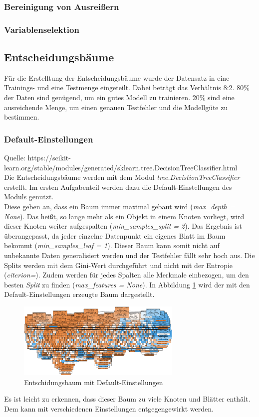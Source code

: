 \subsubsection{Bereinigung von Ausreißern}

\subsubsection{Variablenselektion}




\vspace{1cm}
\subsection{Entscheidungsbäume}
Für die Erstelltung der Entscheidungsbäume wurde der Datensatz in eine Trainings- und eine Testmenge eingeteilt. Dabei beträgt das Verhältnis 8:2. 80\% der Daten sind genügend, um ein gutes Modell zu trainieren. 20\% sind eine ausreichende Menge, um einen genauen Testfehler und die Modellgüte zu bestimmen.
\subsubsection{Default-Einstellungen}
Quelle: https://scikit-learn.org/stable/modules/generated/sklearn.tree.DecisionTreeClassifier.html\\
Die Entscheidungsbäume werden mit dem Modul \emph{tree.DecistionTreeClassifier} erstellt. Im ersten Aufgabenteil werden dazu die Default-Einstellungen des Moduls genutzt.\\
\noindent \hspace*{7mm}
Diese geben an, dass ein Baum immer maximal gebaut wird (\emph{max\_depth = None}). Das heißt, so lange mehr als ein Objekt in einem Knoten vorliegt, wird dieser Knoten weiter aufgespalten (\emph{min\_samples\_split = 2}). Das Ergebnis ist überangepasst, da jeder einzelne Datenpunkt ein eigenes Blatt im Baum bekommt (\emph{min\_samples\_leaf = 1}). Dieser Baum kann somit nicht auf unbekannte Daten generalisiert werden und der Testfehler fällt sehr hoch aus. Die Splits werden mit dem Gini-Wert durchgeführt und nicht mit der Entropie (\emph{citerion=}). Zudem werden für jedes Spalten alle Merkmale einbezogen, um den besten \emph{Split} zu finden (\emph{max\_features = None}). In Abbildung \ref{fig:treedefault} wird der mit den Default-Einstellungen erzeugte Baum dargestellt.
\begin{figure}[h]
	\centering
	\includegraphics[width = 0.7\textwidth]{Bilder/treedefault}
	\caption{Entschidungsbaum mit Default-Einstellungen}
	\label{fig:treedefault}
\end{figure}
Es ist leicht zu erkennen, dass dieser Baum zu viele Knoten und Blätter enthält. Dem kann mit verschiedenen Einstellungen entgegengewirkt werden.
